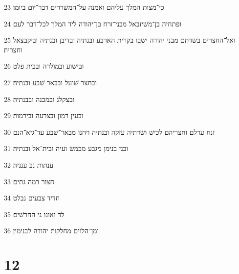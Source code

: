 \par 23 כי־מצות המלך עליהם ואמנה על־המשׁררים דבר־יום ביומו׃
\par 24 ופתחיה בן־משׁיזבאל מבני־זרח בן־יהודה ליד המלך לכל־דבר לעם׃
\par 25 ואל־החצרים בשׂדתם מבני יהודה ישׁבו בקרית הארבע ובנתיה ובדיבן ובנתיה וביקבצאל וחצריה׃
\par 26 ובישׁוע ובמולדה ובבית פלט׃
\par 27 ובחצר שׁועל ובבאר שׁבע ובנתיה׃
\par 28 ובצקלג ובמכנה ובבנתיה׃
\par 29 ובעין רמון ובצרעה ובירמות׃
\par 30 זנח עדלם וחצריהם לכישׁ ושׂדתיה עזקה ובנתיה ויחנו מבאר־שׁבע עד־גיא־הנם׃
\par 31 ובני בנימן מגבע מכמשׂ ועיה ובית־אל ובנתיה׃
\par 32 ענתות נב ענניה׃
\par 33 חצור רמה גתים׃
\par 34 חדיד צבעים נבלט׃
\par 35 לד ואונו גי החרשׁים׃
\par 36 ומן־הלוים מחלקות יהודה לבנימין׃

\chapter{12}

